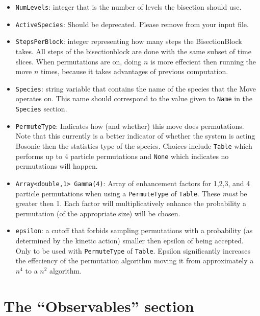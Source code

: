 \documentclass{book}
\begin{document}
\begin{itemize}

  \item \texttt{NumLevels}: integer that is the number of levels the
  bisection should use.
   
  \item \texttt{ActiveSpecies}: Should be deprecated. Please remove
  from your input file. 

  \item \texttt{StepsPerBlock}: integer representing how many steps
  the BisectionBlock takes.  All steps of the bisectionblock are done
  with the same subset of time slices.  When permutations are on, doing $n$
   is more effecient then running the move $n$
  times, because it takes advantages of previous computation.  

  
   \item \texttt{Species}: string variable that contains the name of
   the species that the Move operates on.  This name should correspond
   to the value given to \texttt{Name} in the \texttt{Species}
   section.


   \item \texttt{PermuteType}: Indicates how (and whether) this move
   does permutations.  Note that this currently is a better indicator
   of whether the system is acting Bosonic then the statistics type of
   the species.  Choices include \texttt{Table} which performs up to 4
   particle permutations and \texttt{None} which indicates no
   permutations will happen.

   \item \texttt{Array<double,1> Gamma(4)}: Array of enhancement
     factors for 1,2,3, and 4 particle
     permutations when using a \texttt{PermuteType} of \texttt{Table}.
     These {\em must} be greater then 1.  Each factor will
     multiplicatively enhance the
     probability a permutation (of the appropriate size) will be chosen.
     
   \item \texttt{epsilon}: a cutoff that forbids sampling permutations with
     a probability (as determined by the kinetic action) smaller then epsilon 
     of being accepted.  Only to be used with \texttt{PermuteType} of
     \texttt{Table}. Epsilon significantly increases the 
     effeciency of the permutation algorithm moving it from
     approximately a $n^4$ to a $n^2$ algorithm. 

\end{itemize}
\section{The ``Observables'' section}
\end{document}
